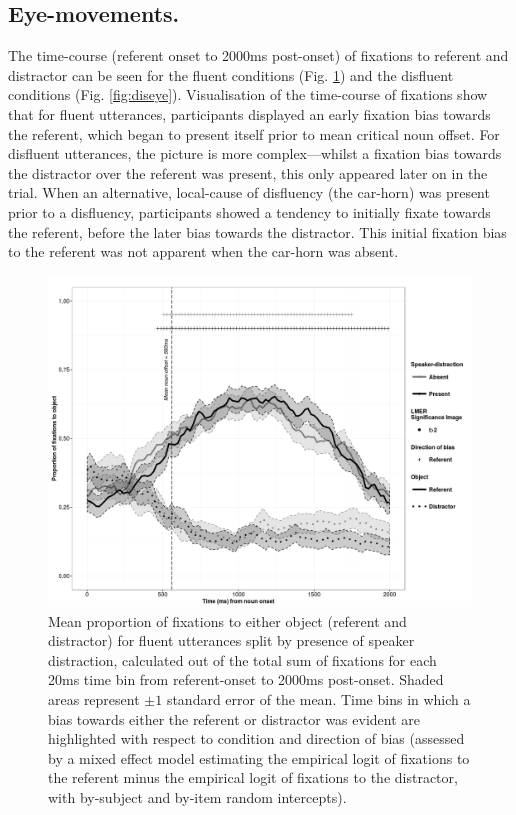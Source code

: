 \documentclass[a4paper,man,natbib]{apa6}
\begin{document}
\subsection{Eye-movements.}
The time-course (referent onset to 2000ms post-onset) of fixations to referent and distractor can be seen for the fluent conditions (Fig. \ref{fig:flueye}) and the disfluent conditions (Fig. \ref{fig:diseye}). 
Visualisation of the time-course of fixations show that for fluent utterances, participants displayed an early fixation bias towards the referent, which began to present itself prior to mean critical noun offset. 
For disfluent utterances, the picture is more complex---whilst a fixation bias towards the distractor over the referent was present, this only appeared later on in the trial.
When an alternative, local-cause of disfluency (the car-horn) was present prior to a disfluency, participants showed a tendency to initially fixate towards the referent, before the later bias towards the distractor. 
This initial fixation bias to the referent was not apparent when the car-horn was absent.


\begin{figure}[Ht]
  \centering
	\includegraphics[scale=.5]{fluent.png}
  \caption{Mean proportion of fixations to either object (referent and distractor) for fluent utterances split by presence of speaker distraction, calculated out of the total sum of fixations for each 20ms time bin from referent-onset to 2000ms post-onset. Shaded areas represent $\pm 1$ standard error of the mean. Time bins in which a bias towards either the referent or distractor was evident are highlighted with respect to condition and direction of bias (assessed by a mixed effect model estimating the empirical logit of fixations to the referent minus the empirical logit of fixations to the distractor, with by-subject and by-item random intercepts).}
  \label{fig:flueye}
\end{figure}
\end{document}
